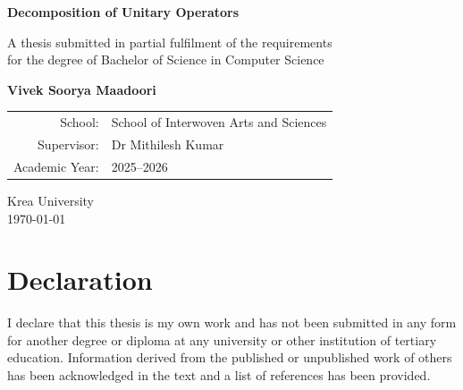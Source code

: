 \documentclass[12pt, a4paper, oneside]{report}
\theoremstyle{plain}
\theoremstyle{definition}
\theoremstyle{remark}
\begin{document}


\begin{titlepage}
	\thispagestyle{empty}
	\begin{center}

		\vspace*{1.5cm}

		{\LARGE\bfseries Decomposition of Unitary Operators}\\[0.8em]

		\vspace{2.5cm}

		{\large A thesis submitted in partial fulfilment of the requirements\\
			for the degree of Bachelor of Science in Computer Science}

		\vspace{2.5cm}

		{\large\bfseries Vivek Soorya Maadoori}

		\vspace{2cm}

		\begin{tabular}{rl}
			School:        & School of Interwoven Arts and Sciences \\[0.3em]
			Supervisor:    & Dr Mithilesh Kumar                     \\[0.3em]
			Academic Year: & 2025--2026                             \\
		\end{tabular}

		\vfill

		{\normalsize
			Krea University\\[1em]
			\today
		}

	\end{center}
\end{titlepage}

\clearpage
\thispagestyle{plain}
\chapter*{Declaration}

I declare that this thesis is my own work and has not been submitted in any form for another
degree or diploma at any university or other institution of tertiary education. Information
derived from the published or unpublished work of others has been acknowledged in the text
and a list of references has been provided.
\end{document}

